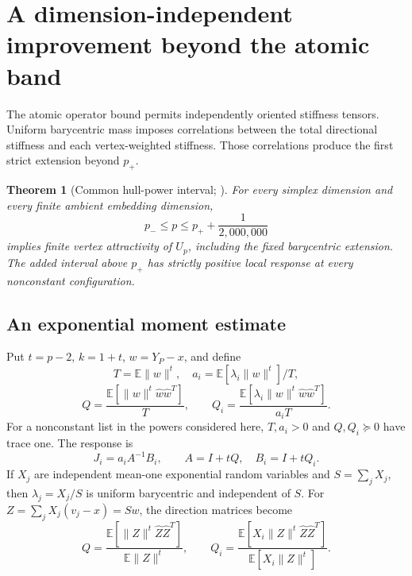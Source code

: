\documentclass[11pt]{article}
\newtheorem{theorem}{Theorem}[section]
\theoremstyle{definition}
\newcommand{\E}{\mathbb E}
\newcommand{\pn}{p_{-}}
\newcommand{\pp}{p_{+}}
\begin{document}
\section{A dimension-independent improvement beyond the atomic band}
The atomic operator bound permits independently oriented stiffness tensors.
Uniform barycentric mass imposes correlations between the total directional
stiffness and each vertex-weighted stiffness. Those correlations produce
the first strict extension beyond $\pp$.

\begin{theorem}[Common hull-power interval; \cite{DimensionReport}]
\label{thm:common}
For every simplex dimension and every finite ambient embedding dimension,
\begin{equation}\label{eq:common}
 \boxed{\pn\le p\le\pp+\frac1{2{,}000{,}000}}
\end{equation}
implies finite vertex attractivity of $U_p$, including the fixed barycentric
extension. The added interval above $\pp$ has strictly positive local
response at every nonconstant configuration.
\end{theorem}

\subsection{An exponential moment estimate}
Put $t=p-2$, $k=1+t$, $w=Y_P-x$, and define
\[
 T=\E\|w\|^t,\quad a_i=\E[\lambda_i\|w\|^t]/T,
\]
\[
 Q=\frac{\E[\|w\|^t\widehat w\widehat w^T]}{T},\qquad
 Q_i=\frac{\E[\lambda_i\|w\|^t\widehat w\widehat w^T]}{a_iT}.
\]
For a nonconstant list in the powers considered here, $T,a_i>0$ and
$Q,Q_i\succeq0$ have trace one. The response is
\begin{equation}\label{eq:normalized}
 J_i=a_iA^{-1}B_i,\qquad A=I+tQ,\quad B_i=I+tQ_i.
\end{equation}
If $X_j$ are independent mean-one exponential random variables and
$S=\sum_jX_j$, then $\lambda_j=X_j/S$ is uniform barycentric and independent
of $S$. For $Z=\sum_jX_j(v_j-x)=Sw$, the direction matrices become
\[
 Q=\frac{\E[\|Z\|^t\widehat Z\widehat Z^T]}{\E\|Z\|^t},\qquad
 Q_i=\frac{\E[X_i\|Z\|^t\widehat Z\widehat Z^T]}{\E[X_i\|Z\|^t]}.
\]
\end{document}
